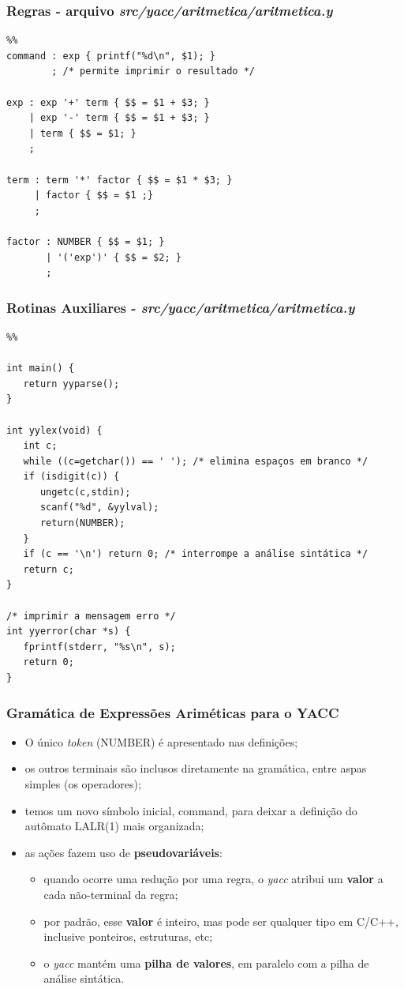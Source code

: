 \documentclass[table]{beamer}
\begin{document}
\begin{frame}[fragile]
   \frametitle{Regras - arquivo \textit{src/yacc/aritmetica/aritmetica.y}}
   \begin{verbatim}
%%
command : exp { printf("%d\n", $1); }
        ; /* permite imprimir o resultado */

exp : exp '+' term { $$ = $1 + $3; }
    | exp '-' term { $$ = $1 + $3; }
    | term { $$ = $1; }
    ;
 
term : term '*' factor { $$ = $1 * $3; }
     | factor { $$ = $1 ;} 
     ;

factor : NUMBER { $$ = $1; }
       | '('exp')' { $$ = $2; }
       ;

   \end{verbatim}
\end{frame}

\begin{frame}[fragile]
   \frametitle{Rotinas Auxiliares - \textit{src/yacc/aritmetica/aritmetica.y}}
   \scriptsize
   \begin{verbatim}
%%

int main() {
   return yyparse();
}

int yylex(void) {
   int c;
   while ((c=getchar()) == ' '); /* elimina espaços em branco */
   if (isdigit(c)) {
      ungetc(c,stdin);
      scanf("%d", &yylval);
      return(NUMBER);
   }
   if (c == '\n') return 0; /* interrompe a análise sintática */
   return c;
}

/* imprimir a mensagem erro */
int yyerror(char *s) {
   fprintf(stderr, "%s\n", s);
   return 0;
}
   \end{verbatim}

\end{frame}

\begin{frame}
   \frametitle{Gramática de Expressões Ariméticas para o YACC}
   \begin{itemize}
      \item O único \textit{token} (NUMBER) é apresentado nas definições;
      \item os outros terminais são inclusos diretamente na gramática, entre aspas simples (os operadores);
      \item temos um novo símbolo inicial, \textsf{command}, para deixar a definição do autômato LALR(1) mais organizada;
      \item as ações fazem uso de \textbf{pseudovariáveis}:
      \begin{itemize}
         \item quando ocorre uma redução por uma regra, o \textit{yacc} atribui um \textbf{valor} a cada não-terminal da regra;
         \item por padrão, esse \textbf{valor} é inteiro, mas pode ser qualquer tipo em C/C++, inclusive ponteiros, estruturas, etc;
         \item o \textit{yacc} mantém uma \textbf{pilha de valores}, em paralelo com a pilha de análise sintática.
      \end{itemize}
   \end{itemize}
\end{frame}
\end{document}
